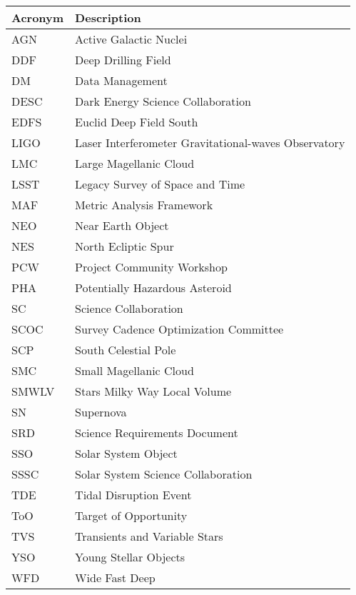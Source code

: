 \addtocounter{table}{-1}
\begin{longtable}{p{}p{}}\hline
\textbf{Acronym} & \textbf{Description}  \\\hline

AGN & 
 Active Galactic Nuclei \\
\hline
DDF & Deep Drilling Field \\
\hline
DM & Data Management \\ 
\hline
DESC & Dark Energy Science Collaboration \\
\hline
EDFS & Euclid Deep Field South \\
\hline
LIGO & 
 Laser Interferometer Gravitational-waves Observatory \\
\hline
LMC & 
 Large Magellanic Cloud \\
\hline
LSST & 
 Legacy Survey of Space and Time \\
\hline
MAF & Metric Analysis Framework \\
\hline
NEO & Near Earth Object \\
\hline
NES & North Ecliptic Spur \\
\hline
PCW & Project Community Workshop \\
\hline
PHA & Potentially Hazardous Asteroid  \\ 
\hline
SC & Science Collaboration \\
\hline
SCOC & Survey Cadence Optimization Committee \\
\hline
SCP & South Celestial Pole \\
\hline
SMC & Small Magellanic Cloud \\
\hline
SMWLV & Stars Milky Way Local Volume \\
\hline
SN & Supernova \\
\hline
SRD & Science Requirements Document \\
\hline
SSO & 
 Solar System Object \\
\hline
SSSC & 
 Solar System Science Collaboration \\
\hline
TDE & Tidal Disruption Event \\
\hline
ToO & Target of Opportunity \\
\hline
TVS & Transients and Variable Stars \\
\hline
YSO & Young Stellar Objects \\
\hline
WFD & Wide Fast Deep \\
\hline
\end{longtable}
